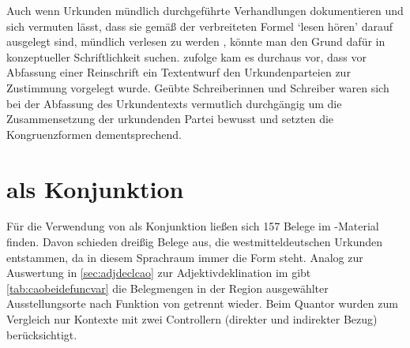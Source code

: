 Auch wenn Urkunden mündlich durchgeführte Verhandlungen dokumentieren und sich
vermuten lässt, dass sie gemäß der verbreiteten Formel 
`lesen hören' darauf ausgelegt sind, mündlich verlesen zu werden
\autocites[595]{schmidtwiegand1998b}[31]{schulze2011}, könnte man den Grund
dafür in konzeptueller Schriftlichkeit suchen. \citet[588--589]{frenz1998b}
zufolge kam es durchaus vor, dass vor Abfassung einer Reinschrift ein
Textentwurf den Urkundenparteien zur Zustimmung vorgelegt wurde. Geübte
Schreiberinnen und Schreiber waren sich bei der Abfassung des Urkundentexts
vermutlich durchgängig um die Zusammensetzung der urkundenden Partei bewusst
und setzten die Kongruenzformen dementsprechend.


\section{ als Konjunktion}
\label{sec:caokonjunktion}

Für die Verwendung von  als Konjunktion ließen sich 157 Belege im
\CAO{}-Material finden. Davon schieden dreißig Belege aus, die
westmitteldeutschen Urkunden entstammen, da in diesem Sprachraum immer die Form
 steht. Analog zur Auswertung in \cref{sec:adjdeclcao} zur
Adjektivdeklination im \CAO{} gibt \cref{tab:caobeidefuncvar} die
Belegmengen in der Region ausgewählter Ausstellungs\-orte nach Funktion von
 getrennt wieder. Beim Quantor wurden zum Vergleich nur Kontexte
mit zwei Controllern (direkter und indirekter Bezug) berücksichtigt.

